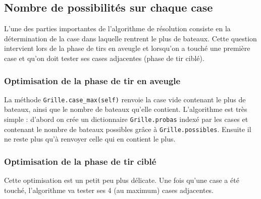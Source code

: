 \subsection{Nombre de possibilités sur chaque case}
L'une des parties importantes de l'algorithme de résolution consiste en la détermination de la case dans laquelle rentrent le plus de bateaux. Cette question intervient lors de la phase de tirs en aveugle et lorsqu'on a touché une première case et qu'on doit tester ses cases adjacentes (phase de tir ciblé).
\subsubsection{Optimisation de la phase de tir en aveugle}
La méthode \texttt{Grille.case\_max(self)} renvoie la case vide contenant le plus de bateaux, ainsi que le nombre de bateaux qu'elle contient. L'algorithme est très simple : d'abord on crée un dictionnaire \texttt{Grille.probas} indexé par les cases et contenant le nombre de bateaux possibles grâce à \texttt{Grille.possibles}. Ensuite il ne reste plus qu'à renvoyer celle qui en contient le plus.

\subsubsection{Optimisation de la phase de tir ciblé}
Cette optimisation est un petit peu plus délicate. Une fois qu'une case a été touché, l'algorithme va tester ses 4 (au maximum) cases adjacentes.